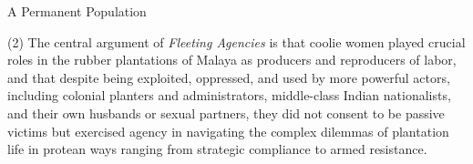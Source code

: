 A Permanent Population

(2) The central argument of \textit{Fleeting Agencies} 
is that coolie women played crucial roles in the rubber plantations of Malaya 
as producers and reproducers of labor, and that despite being exploited, 
oppressed, and used by more powerful actors, including colonial planters and 
administrators, middle-class Indian nationalists, and their own husbands or 
sexual partners, they did not consent to be passive victims but exercised 
agency in navigating the complex dilemmas of plantation life in protean ways 
ranging from strategic compliance to armed resistance.

